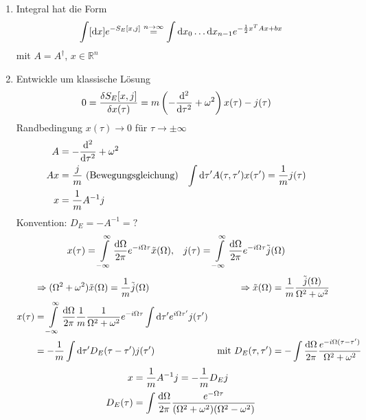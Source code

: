 	\begin{enumerate}[1)]
		\item Integral hat die Form
			\begin{align*}
				\int [\mathrm{d} x] e^{-S_E[x, j]} \overset{n \rightarrow \infty}{=}
				\int \mathrm{d} x_0 \ldots \mathrm{d} x_{n - 1} 
				e^{-\frac{1}{2} x^T A x + b x} 
			\end{align*}
			mit $A= A^\dagger$, $x\in \mathds{R}^n$ 
		\item Entwickle um klassische Lösung 
			\begin{align*}
				0 &= \frac{\delta S_E[x, j]}{\delta x(\tau)} =
				m \left(- \frac{\mathrm{d}^2}{\mathrm{d} \tau^2} + \omega^2\right) x(\tau) - j(\tau)
			\end{align*}
			Randbedingung $x(\tau) \rightarrow 0$ für $\tau \rightarrow \pm \infty$
			\begin{align*}
				A &= - \frac{\mathrm{d}^2}{\mathrm{d} \tau^2} + \omega^2 \\
				Ax &= \frac{j}{m} ~(\text{Bewegungsgleichung}) 
				& \int \mathrm{d} \tau' A(\tau, \tau') x(\tau') &= \frac{1}{m} j(\tau) \\
				x &= \frac{1}{m} A^{-1} j
			\end{align*}
			Konvention: $D_E = -A^{-1} = ?$
			\begin{align*}
				x(\tau) &= \int\limits_{-\infty}^{\infty} \frac{\mathrm{d} \Omega}{2 \pi} e^{-i\Omega \tau} \tilde{x}(\Omega) ,&
				j(\tau) &= \int\limits_{-\infty}^{\infty} \frac{\mathrm{d} \Omega}{2 \pi} e^{-i\Omega \tau} \tilde{j}(\Omega)
			\end{align*}
			\begin{align*}
				&\Rightarrow (\Omega^2 + \omega^2) \tilde{x}(\Omega) = \frac{1}{m} \tilde{j}(\Omega) &
				\Rightarrow \tilde{x}(\Omega) &= \frac{1}{m} \frac{\tilde{j}(\Omega)}{\Omega^2 + \omega^2} \\
				x(\tau) &= \int\limits_{-\infty}^{\infty} \frac{\mathrm{d} \Omega}{2 \pi}
				\frac{1}{m} \frac{1}{\Omega^2 + \omega^2} e^{-i\Omega \tau} 
				\int \mathrm{d} \tau' e^{i\Omega \tau'} j(\tau') \\
				&= -\frac{1}{m} \int \mathrm{d} \tau' D_E(\tau - \tau') j(\tau') &
				\text{mit }D_E(\tau, \tau') &= - \int \frac{\mathrm{d} \Omega}{2 \pi} \frac{e^{-i \Omega (\tau-\tau')}}{\Omega^2 + \omega^2}
			\end{align*}
			\begin{align*}
				x &= \frac{1}{m} A^{-1} j = - \frac{1}{m} D_E j \\
				D_E (\tau) &= \int \frac{\diff \Omega}{2 \pi} \frac{e^{-\Omega \tau}}{(\Omega^2 + \omega^2)(\Omega^2 - \omega^2)} \\

\end{align*}
\end{enumerate}
